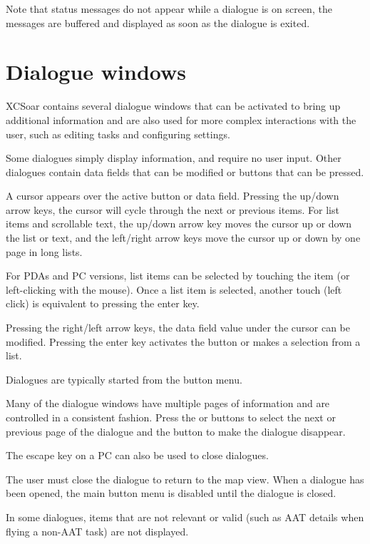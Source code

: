 Note that status messages do not appear while a dialogue is on screen, the
messages are buffered and displayed as soon as the dialogue is exited.


\section{Dialogue windows}\label{sec:dialog-windows}

XCSoar contains several dialogue windows that can be activated to bring up
additional information and are also used for more complex interactions with the
user, such as editing tasks and configuring settings.

Some dialogues simply display information, and require no user input. Other
dialogues contain data fields that can be modified or buttons that can be pressed.  

A cursor appears over the active button or data field. Pressing the up/down
arrow keys, the cursor will cycle
through the next or previous items. For list items and scrollable text, the
up/down arrow key moves the cursor up or down the list or text, and the
left/right arrow keys move the cursor up or down by one page in long lists.

For PDAs and PC versions, list items can be selected by touching the item (or
left-clicking with the mouse). Once a list item is selected, another touch
(left click) is equivalent to pressing the enter key.

Pressing the right/left arrow keys, the data field value under the
cursor can be modified. Pressing the enter key activates the button or
makes a selection from a list.

Dialogues are typically started from the button menu.  

Many of the dialogue windows have multiple pages of information and are controlled
in a consistent fashion. Press the \bmenuw{$<$} or \bmenuw{$>$} buttons to
select the next or previous page of the dialogue and the  button 
to make the dialogue disappear.

The escape key on a PC can also be used to close dialogues.

The user must close the dialogue to return to the map view. When a dialogue
has been opened, the main button menu is disabled until the dialogue is closed.

In some dialogues, items that are not relevant or valid (such as AAT details when
flying a non-AAT task) are not displayed.

